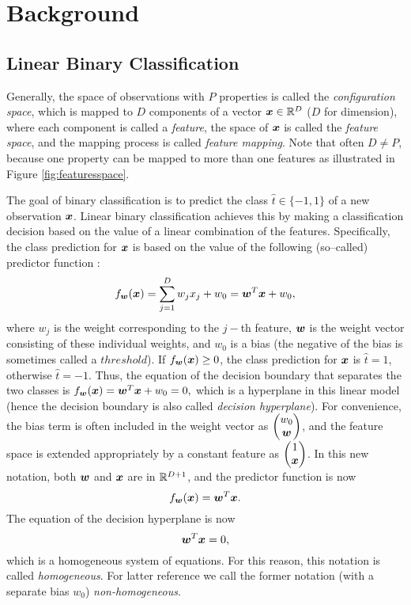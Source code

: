 \section{Background}
\label{cha:background}

\subsection{Linear Binary Classification}
\label{sec:bgr.formulation}

Generally, the space of observations with $P$ properties is called the \emph{configuration space}, which is mapped to $D$ components of a vector $\boldsymbol{x} \in \mathbb{R}^D$ ($D$ for dimension), where each component is called a \emph{feature}, the space of $\boldsymbol{x}$ is called the \emph{feature space}, and the mapping process is called \emph{feature mapping}. Note that often $D \not= P$, because one property can be mapped to more than one features as illustrated in Figure \ref{fig:featuresspace}.  

The goal of binary classification is to predict the class $\hat{t} \in \{ -1, 1 \}$ of a new observation $\boldsymbol{x}$. Linear binary classification achieves this by making a classification decision based on the value of a linear combination of the features. Specifically, the class prediction for $\boldsymbol{x}$ is based on the value of the following (so--called) predictor function \cite{bishop06}: 
\begin{equation} 
\label{eq:predictor}
f_{\boldsymbol{w}}(\boldsymbol{x}) = \sum_{j=1}^D w_j x_j + w_0 = \boldsymbol{w}^T \boldsymbol{x} + w_0,
\end{equation}
where $w_j$ is the weight corresponding to the $j-$th feature, $\boldsymbol{w}$ is the weight vector consisting of these individual weights, and $w_0$ is a bias (the negative of the bias is sometimes called a $threshold$). If $f_{\boldsymbol{w}}(\boldsymbol{x}) \geq 0$, the class prediction for $\boldsymbol{x}$ is $\hat{t} = 1$, otherwise $\hat{t} = -1$. Thus, the equation of the decision boundary that separates the two classes is $f_{\boldsymbol{w}}(\boldsymbol{x}) = \boldsymbol{w}^T \boldsymbol{x} + w_0 = 0,$
which is a hyperplane in this linear model (hence the decision boundary is also called \emph{decision hyperplane}). For convenience, the bias term is often included in the weight vector as $\begin{pmatrix}
w_0\\ \boldsymbol{w} \end{pmatrix}$, and the feature space is extended appropriately by a constant feature as $\begin{pmatrix} 1\\ \boldsymbol{x} \end{pmatrix}$. In this new notation, both $\boldsymbol{w}$ and $\boldsymbol{x}$ are in $\mathbb{R}^{D+1}$, and the predictor function is now $$f_{\boldsymbol{w}}(\boldsymbol{x}) = \boldsymbol{w}^T \boldsymbol{x}.$$ The equation of the decision hyperplane is now $$\boldsymbol{w}^T \boldsymbol{x} = 0,$$ which is a homogeneous system of equations. For this reason, this notation is called \emph{homogeneous}. For latter reference we call the former notation (with a separate bias $w_0$) \emph{non-homogeneous}. 

